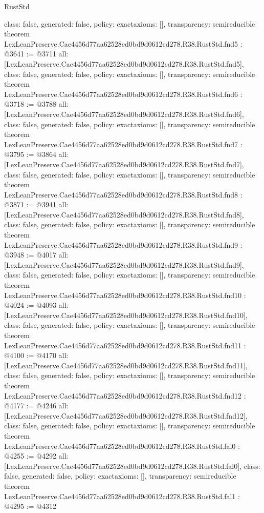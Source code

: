 \begin{lexlean}{RustStd}
\begin{coremodule}
{  class: false,
  generated: false,
  policy: exact{axioms: []},
  transparency: semireducible
}
theorem LexLeanPreserve.Cae4456d77aa62528ed0bd9d0612cd278.R38.RustStd.fnd5 : @3641 := @3711 {
  all: [LexLeanPreserve.Cae4456d77aa62528ed0bd9d0612cd278.R38.RustStd.fnd5],
  class: false,
  generated: false,
  policy: exact{axioms: []},
  transparency: semireducible
}
theorem LexLeanPreserve.Cae4456d77aa62528ed0bd9d0612cd278.R38.RustStd.fnd6 : @3718 := @3788 {
  all: [LexLeanPreserve.Cae4456d77aa62528ed0bd9d0612cd278.R38.RustStd.fnd6],
  class: false,
  generated: false,
  policy: exact{axioms: []},
  transparency: semireducible
}
theorem LexLeanPreserve.Cae4456d77aa62528ed0bd9d0612cd278.R38.RustStd.fnd7 : @3795 := @3864 {
  all: [LexLeanPreserve.Cae4456d77aa62528ed0bd9d0612cd278.R38.RustStd.fnd7],
  class: false,
  generated: false,
  policy: exact{axioms: []},
  transparency: semireducible
}
theorem LexLeanPreserve.Cae4456d77aa62528ed0bd9d0612cd278.R38.RustStd.fnd8 : @3871 := @3941 {
  all: [LexLeanPreserve.Cae4456d77aa62528ed0bd9d0612cd278.R38.RustStd.fnd8],
  class: false,
  generated: false,
  policy: exact{axioms: []},
  transparency: semireducible
}
theorem LexLeanPreserve.Cae4456d77aa62528ed0bd9d0612cd278.R38.RustStd.fnd9 : @3948 := @4017 {
  all: [LexLeanPreserve.Cae4456d77aa62528ed0bd9d0612cd278.R38.RustStd.fnd9],
  class: false,
  generated: false,
  policy: exact{axioms: []},
  transparency: semireducible
}
theorem LexLeanPreserve.Cae4456d77aa62528ed0bd9d0612cd278.R38.RustStd.fnd10 : @4024 := @4093 {
  all: [LexLeanPreserve.Cae4456d77aa62528ed0bd9d0612cd278.R38.RustStd.fnd10],
  class: false,
  generated: false,
  policy: exact{axioms: []},
  transparency: semireducible
}
theorem LexLeanPreserve.Cae4456d77aa62528ed0bd9d0612cd278.R38.RustStd.fnd11 : @4100 := @4170 {
  all: [LexLeanPreserve.Cae4456d77aa62528ed0bd9d0612cd278.R38.RustStd.fnd11],
  class: false,
  generated: false,
  policy: exact{axioms: []},
  transparency: semireducible
}
theorem LexLeanPreserve.Cae4456d77aa62528ed0bd9d0612cd278.R38.RustStd.fnd12 : @4177 := @4246 {
  all: [LexLeanPreserve.Cae4456d77aa62528ed0bd9d0612cd278.R38.RustStd.fnd12],
  class: false,
  generated: false,
  policy: exact{axioms: []},
  transparency: semireducible
}
theorem LexLeanPreserve.Cae4456d77aa62528ed0bd9d0612cd278.R38.RustStd.fal0 : @4255 := @4292 {
  all: [LexLeanPreserve.Cae4456d77aa62528ed0bd9d0612cd278.R38.RustStd.fal0],
  class: false,
  generated: false,
  policy: exact{axioms: []},
  transparency: semireducible
}
theorem LexLeanPreserve.Cae4456d77aa62528ed0bd9d0612cd278.R38.RustStd.fal1 : @4295 := @4312 {
}
\end{coremodule}
\end{lexlean}
